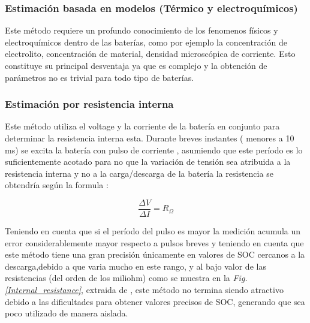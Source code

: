 \documentclass[10pt,a4paper]{article}
\begin{document}
\clearpage

\subsubsection{Estimación basada en modelos (Térmico y electroquímicos)}
Este método requiere un profundo conocimiento de los fenomenos físicos y electroquímicos dentro de las baterías, como por ejemplo la concentración de electrolito, concentración de material, densidad microscópica de corriente. Esto constituye su principal desventaja ya que es complejo y la obtención de parámetros no es trivial para todo tipo de baterías.


\subsubsection{Estimación por resistencia interna}

Este método utiliza el voltage y la corriente de la batería en conjunto para determinar la resistencia interna esta. Durante breves instantes ( menores a 10 ms) se excita la batería con pulso de corriente , asumiendo que este período es lo suficientemente acotado para no que la variación de tensión sea atribuida a la resistencia interna y no a la carga/descarga de la batería la resistencia se obtendría según la formula :

\begin{figure}[h!]
	\begin{center}
		\begin{equation}
		\frac{\Delta V}{\Delta I} = R_\Omega 
		\label{Internal_resistance_EQ}
		\end{equation}	
	\end{center}
\end{figure}

 Teniendo en cuenta que si el período del pulso es mayor la medición acumula un error considerablemente mayor respecto a pulsos breves y teniendo en cuenta que este método tiene una gran precisión únicamente en valores de SOC cercanos a la descarga,debido a que varia mucho en este rango, y al bajo valor de las resistencias (del orden de los miliohm) como se muestra en la \emph{ Fig. \ref{Internal_resistance}}, extraida de \cite{hentunen}, este método no termina siendo atractivo debido a las dificultades para obtener valores precisos de SOC, generando que sea poco utilizado de manera aislada.
 
\end{document}
